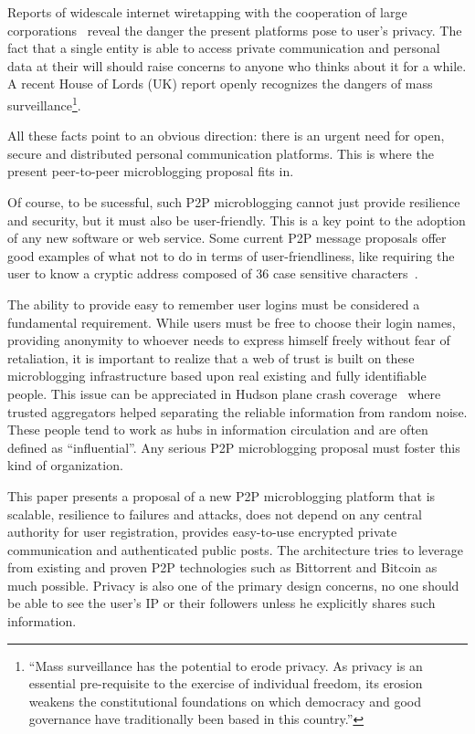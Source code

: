 \documentclass[a4paper,10pt]{article}
\begin{document}
Reports of widescale internet wiretapping with the cooperation of large corporations~\cite{greenwald2013} reveal the danger the present platforms pose to user's privacy. The fact that a single entity is able to access private communication and personal data at their will should raise concerns to anyone who thinks about it for a while. A recent House of Lords (UK) report openly recognizes the dangers of mass surveillance\footnote{``Mass surveillance has the potential to erode privacy. As privacy is an essential pre-requisite to the exercise of individual freedom, its erosion weakens the constitutional foundations on which democracy and good governance have traditionally been based in this country.''\cite{surveillance}}.

All these facts point to an obvious direction: there is an urgent need for open, secure and distributed personal communication platforms. This is where the present peer-to-peer microblogging proposal fits in.

Of course, to be sucessful, such P2P microblogging cannot just provide resilience and security, but it must also be user-friendly. This is a key point to the adoption of any new software or web service. Some current P2P message proposals offer good examples of what not to do in terms of user-friendliness, like requiring the user to know a cryptic address composed of 36 case sensitive characters~\cite{warren2012bitmessage}.

The ability to provide easy to remember user logins must be considered a fundamental requirement. While users must be free to choose their login names, providing anonymity to whoever needs to express himself freely without fear of retaliation, it is important to realize that a web of trust is built on these microblogging infrastructure based upon real existing and fully identifiable people. This issue can be appreciated in Hudson plane crash coverage~\cite{sklar2009} where trusted aggregators helped separating the reliable information from random noise. These people tend to work as hubs in information circulation and are often defined as ``influential''. Any serious P2P microblogging proposal must foster this kind of organization.

This paper presents a proposal of a new P2P microblogging platform that is scalable, resilience to failures and attacks, does not depend on any central authority for user registration, provides easy-to-use encrypted private communication and authenticated public posts. The architecture tries to leverage from existing and proven P2P technologies such as Bittorrent and Bitcoin as much possible. Privacy is also one of the primary design concerns, no one should be able to see the user's IP or their followers unless he explicitly shares such information.
\end{document}
